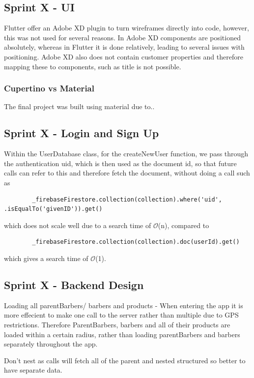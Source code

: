 \documentclass[12pt]{article}
\begin{document}
	
	
	\subsection{Sprint X - UI}
	Flutter offer an Adobe XD plugin to turn wireframes directly into code, however, this was not used for several reasons. In Adobe XD components are positioned absolutely, whereas in Flutter it is done relatively, leading to several issues with positioning. Adobe XD also does not contain customer properties and therefore mapping these to components, such as title is not possible.
	
	\subsubsection{Cupertino vs Material}
	The final project was built using material due to..
	
	\subsection{Sprint X - Login and Sign Up}
	Within the UserDatabase class, for the createNewUser function, we pass through the authentication uid, which is then used as the document id, so that future calls can refer to this and therefore fetch the document, without doing a call such as 
	\begin{lstlisting}
		_firebaseFirestore.collection(collection).where('uid', .isEqualTo('givenID')).get()
	\end{lstlisting}
	which does not scale well due to a search time of $\mathcal{O}$(n), compared to 
	\begin{lstlisting}
		_firebaseFirestore.collection(collection).doc(userId).get()
	\end{lstlisting}
	which gives a search time of $\mathcal{O}$(1).
	
	
	\subsection{Sprint X - Backend Design}
	
	Loading all parentBarbers/ barbers and products - 
	When entering the app it is more effecient to make one call to the server rather than multiple due to GPS restrictions. Therefore ParentBarbers, barbers and all of their products are loaded within a certain radius, rather than loading parentBarbers and barbers separately throughout the app. 
	
	Don't nest as calls will fetch all of the parent and nested structured so better to have separate data.
	
\end{document}
